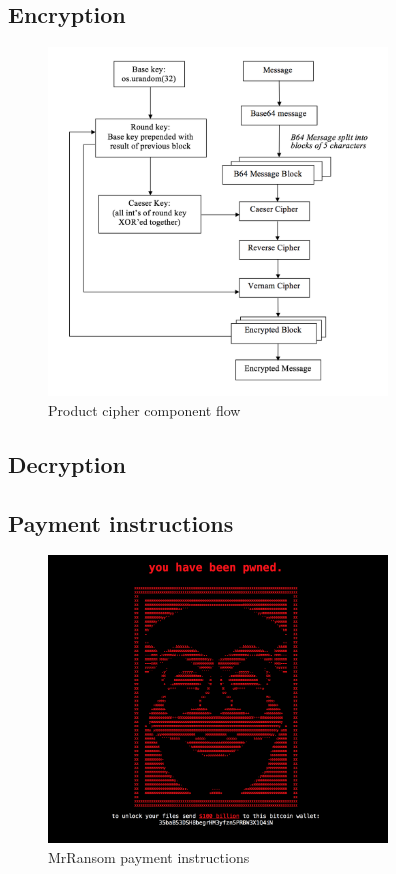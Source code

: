 \documentclass[12pt]{article}
\begin{document}
  \subsection{Encryption}
    \begin{figure}[ht]
      \centering
      \includegraphics[width=9cm]{cipher-diagram}
      \caption{Product cipher component flow}
      \label{fig:cipher-diagram}
    \end{figure}


  \subsection{Decryption}

  \subsection{Payment instructions}
    \begin{figure}[ht]
      \centering
      \includegraphics[width=9cm]{payment}
      \caption{MrRansom payment instructions}
      \label{fig:mrransom-payment-instructions}
    \end{figure}
\end{document}
